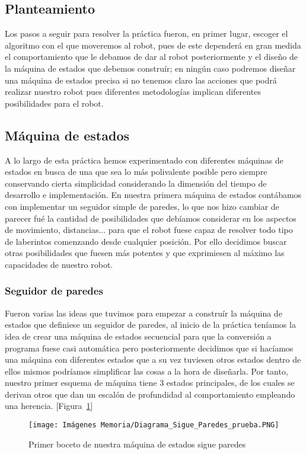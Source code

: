 \documentclass[a4paper,9pt]{article}
\begin{document}
\subsection{Planteamiento}
Los pasos a seguir para resolver la práctica fueron, en primer lugar, escoger el algoritmo con el que moveremos al robot, pues de este dependerá en gran medida el comportamiento que le debamos de dar al robot posteriormente y el diseño de la máquina de estados que debemos construír; en ningún caso podremos diseñar una máquina de estados precisa si no tenemos claro las acciones que podrá realizar nuestro robot pues diferentes metodologías implican diferentes posibilidades para el robot.

\subsection{Máquina de estados}
A lo largo de esta práctica hemos experimentado con diferentes máquinas de estados en busca de una que sea lo más polivalente posible pero siempre conservando cierta simplicidad considerando la dimensión del tiempo de desarrollo e implementación. En nuestra primera máquina de estados contábamos con implementar un seguidor simple de paredes, lo que nos hizo cambiar de parecer fué la cantidad de posibilidades que debíamos 
considerar en los aspectos de movimiento, distancias... para que el robot fuese capaz de resolver todo tipo de 
laberintos comenzando desde cualquier posición. Por ello decidimos buscar otras posibilidades que fuesen más 
potentes y que exprimiesen al máximo las capacidades de nuestro robot.  

\subsubsection{Seguidor de paredes}
Fueron varias las ideas que tuvimos para empezar a construír la máquina de estados que definiese un seguidor 
de paredes, al inicio de la práctica teníamos la idea de crear una máquina de estados secuencial para que 
la conversión a programa fuese casi automática pero posteriormente decidimos que si hacíamos una máquina 
con diferentes estados que a su vez tuviesen otros estados dentro de ellos mismos podríamos simplificar las 
cosas a la hora de diseñarla. Por tanto, nuestro primer esquema de máquina tiene 3 estados principales, de los 
cuales se derivan otros que dan un escalón de profundidad al comportamiento empleando una herencia.
[Figura~\ref{fig:seguidor1}]

\begin{figure}[h!]
    \centering
    \texttt{[image: Imágenes Memoria/Diagrama\_Sigue\_Paredes\_prueba.PNG]}
    \caption{Primer boceto de nuestra máquina de estados sigue paredes}
    \label{fig:seguidor1}
\end{figure}
\end{document}
